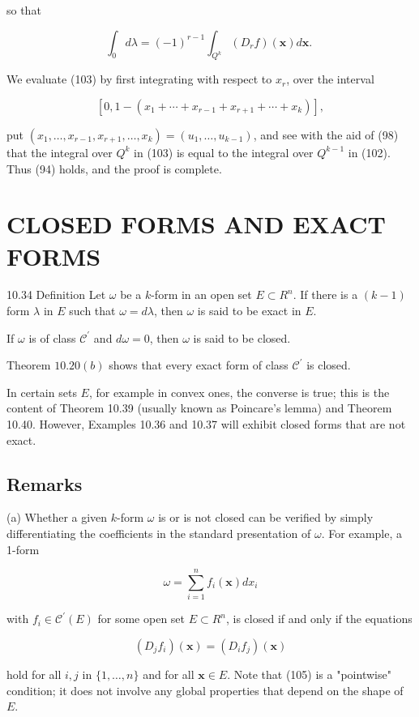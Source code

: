 \documentclass[10pt]{article}
\begin{document}
so that

$$
\int_{0} d \lambda=(-1)^{r-1} \int_{Q^{k}}\left(D_{r} f\right)(\mathbf{x}) d \mathbf{x} \text {. }
$$

We evaluate (103) by first integrating with respect to $x_{r}$, over the interval

$$
\left[0,1-\left(x_{1}+\cdots+x_{r-1}+x_{r+1}+\cdots+x_{k}\right)\right],
$$

put $\left(x_{1}, \ldots, x_{r-1}, x_{r+1}, \ldots, x_{k}\right)=\left(u_{1}, \ldots, u_{k-1}\right)$, and see with the aid of (98) that the integral over $Q^{k}$ in (103) is equal to the integral over $Q^{k-1}$ in (102). Thus (94) holds, and the proof is complete.

\section{CLOSED FORMS AND EXACT FORMS}
10.34 Definition Let $\omega$ be a $k$-form in an open set $E \subset R^{n}$. If there is a $(k-1)$ form $\lambda$ in $E$ such that $\omega=d \lambda$, then $\omega$ is said to be exact in $E$.

If $\omega$ is of class $\mathscr{C}^{\prime}$ and $d \omega=0$, then $\omega$ is said to be closed.

Theorem $10.20(b)$ shows that every exact form of class $\mathscr{C}^{\prime}$ is closed.

In certain sets $E$, for example in convex ones, the converse is true; this is the content of Theorem 10.39 (usually known as Poincare's lemma) and Theorem 10.40. However, Examples 10.36 and 10.37 will exhibit closed forms that are not exact.

\subsection{Remarks}
(a) Whether a given $k$-form $\omega$ is or is not closed can be verified by simply differentiating the coefficients in the standard presentation of $\omega$. For example, a 1-form

$$
\omega=\sum_{i=1}^{n} f_{i}(\mathbf{x}) d x_{i}
$$

with $f_{i} \in \mathscr{C}^{\prime}(E)$ for some open set $E \subset R^{n}$, is closed if and only if the equations

$$
\left(D_{j} f_{i}\right)(\mathbf{x})=\left(D_{i} f_{j}\right)(\mathbf{x})
$$

hold for all $i, j$ in $\{1, \ldots, n\}$ and for all $\mathbf{x} \in E$. Note that (105) is a "pointwise" condition; it does not involve any global properties that depend on the shape of $E$.
\end{document}
